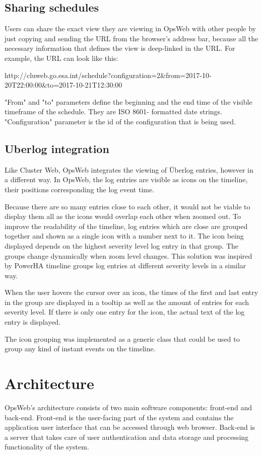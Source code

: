 \subsection{Sharing schedules}
Users can share the exact view they are viewing in OpsWeb with other people by just copying and sending the URL from the browser's address bar, because all the necessary information that defines the view is deep-linked in the URL. For example, the URL can look like this:

http://cluweb.go.esa.int/schedule?configuration=2\&from=2017-10-20T22:00:00\&to=2017-10-21T12:30:00

"From" and "to" parameters define the beginning and the end time of the visible timeframe of the schedule. They are ISO 8601- formatted date strings. "Configuration" parameter is the id of the configuration that is being used.

\subsection{Uberlog integration}
Like Cluster Web, OpsWeb integrates the viewing of Überlog entries, however in a different way. In OpsWeb, the log entries are visible as icons on the timeline, their positions corresponding the log event time. 

Because there are so many entries close to each other, it would not be viable to display them all as the icons would overlap each other when zoomed out. To improve the readability of the timeline, log entries which are close are grouped together and shown as a single icon with a number next to it. The icon being displayed depends on the highest severity level log entry in that group. The groups change dynamically when zoom level changes. This solution was inspired by PowerHA timeline groups log entries at different severity levels in a similar way. \cite{ibm_timeline}

When the user hovers the cursor over an icon, the times of the first and last entry in the group are displayed in a tooltip as well as the amount of entries for each severity level. If there is only one entry for the icon, the actual text of the log entry is displayed.

The icon grouping was implemented as a generic class that could be used to group any kind of instant events on the timeline.
\section{Architecture}
OpsWeb's architecture consists of two main software components: front-end and back-end. Front-end is the user-facing part of the system and contains the application user interface that can be accessed through web browser. Back-end is a server that takes care of user authentication and data storage and processing functionality of the system.
